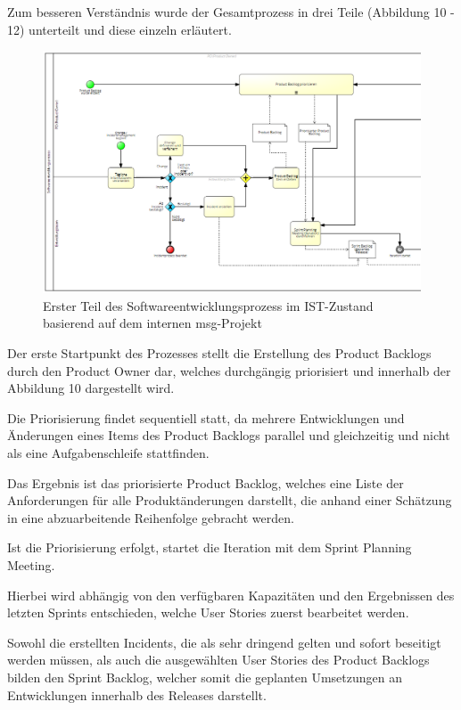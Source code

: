 Zum besseren Verständnis wurde der Gesamtprozess in drei Teile (Abbildung 10 - 12) unterteilt und diese einzeln erläutert.\\

\begin{figure}[h]
    \centering
    \includegraphics[scale=0.5]{Bilder/IST-Prozess_first Part.png}
    \caption{Erster Teil des Softwareentwicklungsprozess im IST-Zustand basierend auf dem internen msg-Projekt}
\end{figure}

Der erste Startpunkt des Prozesses stellt die Erstellung des Product Backlogs durch den Product Owner dar, welches durchgängig priorisiert und innerhalb der Abbildung 10 dargestellt wird. 

Die Priorisierung findet sequentiell statt, da mehrere Entwicklungen und Änderungen eines Items des Product Backlogs parallel und gleichzeitig und nicht als eine Aufgabenschleife stattfinden. 

Das Ergebnis ist das priorisierte Product Backlog, welches eine Liste der Anforderungen für alle Produktänderungen darstellt, die anhand einer Schätzung in eine abzuarbeitende Reihenfolge gebracht werden. 

Ist die Priorisierung erfolgt, startet die Iteration mit dem Sprint Planning Meeting. 

Hierbei wird abhängig von den verfügbaren Kapazitäten und den Ergebnissen des letzten Sprints entschieden, welche User Stories zuerst bearbeitet werden. 

Sowohl die erstellten Incidents, die als sehr dringend gelten und sofort beseitigt werden müssen, als auch die ausgewählten User Stories des Product Backlogs bilden den Sprint Backlog, welcher somit die geplanten Umsetzungen an Entwicklungen innerhalb des Releases darstellt.

